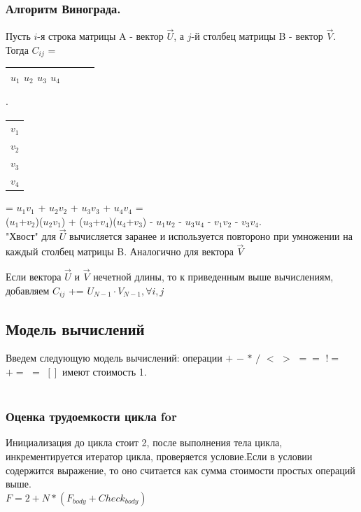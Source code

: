 \documentclass[12pt]{article}
\begin{document}
\subsubsection{Алгоритм Винограда.}
Пусть $i$-я строка матрицы A - вектор  $\vec{U}$, а $j$-й столбец матрицы B - вектор $\vec{V}$. \\
Тогда $C_{ij}$ = \begin{tabular}{|c|c|c|c|}
	\hline
	$u_{1}$  $u_{2}$  $u_{3}$  $u_{4}$ \\
	\hline
\end{tabular} $\cdot$ 
\begin{tabular}{|c|}
	\hline
	$v_{1}$ \\
	$v_{2}$  \\
	$v_{3}$   \\
	$v_{4}$  \\
	\hline
\end{tabular}
= $u_{1}$$v_{1}$ + $u_{2}$$v_{2}$ + $u_{3}$$v_{3}$ + $u_{4}$$v_{4}$ = \\
($u_{1}$+$v_{2}$)($u_{2}$$v_{1}$) + ($u_{3}$+$v_{4}$)($u_{4}$+$v_{3}$) - $u_{1}$$u_{2}$ - $u_{3}$$u_{4}$ - $v_{1}$$v_{2}$ - $v_{3}$$v_{4}$. \\

"Хвост" для  $\vec{U}$ вычисляется заранее и используется повтороно при умножении на каждый столбец матрицы B. Аналогично для вектора $\vec{V}$

Если вектора $\vec{U}$ и $\vec{V}$ нечетной длины, то к приведенным выше вычислениям, добавляем 
$C_{ij}$ += $U_{N-1}\cdot V_{N-1}, \forall i,j$
\\

\subsection{Модель вычислений}
Введем следующую модель вычислений:
операции $+$  $-$  $*$  $/$  $<$  $>$  $==$  $!=$  $+=$  $=$  $[]$  имеют стоимость 1.
\\
\\
\subsubsection{Оценка трудоемкости цикла for}
Инициализация до цикла стоит 2, после выполнения тела цикла, инкрементируется итератор цикла, проверяется условие.Если в условии содержится выражение, то оно считается как сумма стоимости простых операций выше.
\\
$F = 2 + N*(F_{body} + Check_{body})$
\end{document}
